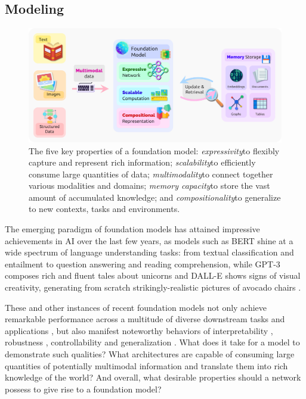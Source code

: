 \newsection 
\subsection{Modeling}
\label{sec:modeling}



\begin{figure}[!ht]     
\centering
\includegraphics[width=\linewidth]{technology/figures/Modeling_1.png}
\caption{The five key properties of a foundation model:  \textit{expressivity}\dash{}to flexibly capture and represent rich information; \textit{scalability}\dash{}to efficiently consume large quantities of data; \textit{multimodality}\dash{}to connect together various modalities and domains; \textit{memory capacity}\dash{}to store the vast amount of accumulated knowledge; and \textit{compositionality}\dash{}to generalize to new contexts, tasks and environments.}     
\label{fig:modeling} 
\end{figure}

The emerging paradigm of foundation models has attained impressive achievements in AI over the last few years, as models such as BERT \citep{devlin2019bert} shine at a wide spectrum of language understanding tasks: from textual classification and entailment to question answering and reading comprehension, while GPT-3 composes rich and fluent tales about unicorns \citep{brown2020gpt3} and DALL-E  shows signs of visual creativity, generating from scratch strikingly-realistic pictures of avocado chairs \citep{ramesh2021zeroshot}.

These and other instances of recent foundation models not only achieve remarkable performance across a multitude of diverse downstream tasks and applications \citep{squad2,wang2019superglue}, but also manifest noteworthy behaviors of interpretability \citep{stylegan2}, robustness \citep{devlin2019bert}, controllability \citep{styleclip} and generalization \citep{brown2020gpt3}. What does it take for a model to demonstrate such qualities? What architectures are capable of consuming large quantities of potentially multimodal information and translate them into rich knowledge of the world? And overall, what desirable properties should a network possess to give rise to a foundation model?

